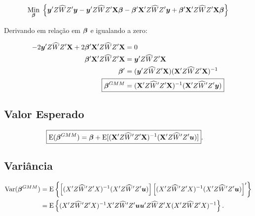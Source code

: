\documentclass[11pt, oneside, a4paper, article]{article}
\numberwithin{equation}{section}
\begin{document}
\begin{description}
\vspace{-1 em}
\begin{align*}
\underset{\boldsymbol{\beta}}{\text{Min}} \;
\left\{ 
\boldsymbol{y}' Z \widehat{W} Z' \boldsymbol{y}
-
\boldsymbol{y}' Z \widehat{W} Z' \mathbf{X} \boldsymbol{\beta}
-
\boldsymbol{\beta}' \mathbf{X}'  Z \widehat{W} Z' \boldsymbol{y}
+
\boldsymbol{\beta}' \mathbf{X}'  Z \widehat{W} Z' \mathbf{X} \boldsymbol{\beta}
\right\}
\end{align*}

Derivando em relação em $\boldsymbol{\beta}$ e igualando a zero:

\vspace{-1 em}
\begin{align*}
-2 \yvec' Z \widehat{W} Z' \Xmat + 2 \betavec'\Xmat' Z \widehat{W} Z' \Xmat &= 0
\\
\betavec'\Xmat' Z \widehat{W} Z' \Xmat &= \yvec' Z \widehat{W} Z' \Xmat 
\\
\betavec' &= ( \yvec' Z \widehat{W} Z' \Xmat ) ( \Xmat' Z \widehat{W} Z' \Xmat )^{-1}
\\
\Aboxed{
\betavec^{GMM} &= ( \Xmat' Z \widehat{W}' Z' \Xmat )^{-1} ( \Xmat' Z \widehat{W}' Z' \yvec ) }
\end{align*}

\subsection{Valor Esperado} 

\vspace{-1 em}
\begin{align*}
\Aboxed{
\E( \betavec^{GMM} ) &=
\betavec +
\E[ ( \Xmat' Z \widehat{W}' Z' \Xmat )^{-1} ( \Xmat' Z \widehat{W}' Z' \uvec ) ] }.
\end{align*}

\subsection{Variância} 

\vspace{-1 em}
\begin{align*}
\text{Var}( \boldsymbol{\beta}^{GMM} ) &=
\text{E} \left\{ 
\left[ ( X' Z \widehat{W}' Z' X )^{-1} ( X' Z \widehat{W}' Z' \boldsymbol{u} ) \right]
\left[ ( X' Z \widehat{W}' Z' X )^{-1} ( X' Z \widehat{W}' Z' \boldsymbol{u} ) \right]'
\right\}
\\ &=
\text{E} \left\{ 
( X' Z \widehat{W}' Z' X )^{-1}
X' Z \widehat{W}' Z' \boldsymbol{u} \boldsymbol{u}' Z \widehat{W} Z' X 
( X' Z \widehat{W} Z' X )^{-1}
\right\}.
\end{align*}


\end{description}
\end{document}
